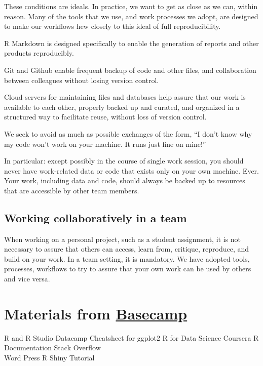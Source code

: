 \documentclass[
]{book}
\begin{document}
These conditions are ideals. In practice, we want to get as close as we can, within reason. Many of the tools that we use, and work processes we adopt, are designed to make our workflows hew closely to this ideal of full reproducibility.

R Markdown is designed specifically to enable the generation of reports and other products reproducibly.

Git and Github enable frequent backup of code and other files, and collaboration between colleagues without losing version control.

Cloud servers for maintaining files and databases help assure that our work is available to each other, properly backed up and curated, and organized in a structured way to facilitate reuse, without loss of version control.

We seek to avoid as much as possible exchanges of the form, ``I don't know why my code won't work on your machine. It runs just fine on mine!''

In particular: except possibly in the course of single work session, you should never have work-related data or code that exists only on your own machine. Ever. Your work, including data and code, should always be backed up to resources that are accessible by other team members.

\hypertarget{working-collaboratively-in-a-team}{%
\section{Working collaboratively in a team}\label{working-collaboratively-in-a-team}}

When working on a personal project, such as a student assignment, it is not necessary to assure that others can access, learn from, critique, reproduce, and build on your work. In a team setting, it is mandatory. We have adopted tools, processes, workflows to try to assure that your own work can be used by others and vice versa.

\hypertarget{materials-from-basecamp}{%
\chapter{\texorpdfstring{Materials from \href{https://3.basecamp.com/4370323/buckets/15566178/documents/2688047578}{Basecamp}}{Materials from Basecamp}}\label{materials-from-basecamp}}

R and R Studio
Datacamp
Cheatsheet for ggplot2
R for Data Science
Coursera
R Documentation
Stack Overflow\\
Word Press
R Shiny
Tutorial
\end{document}
